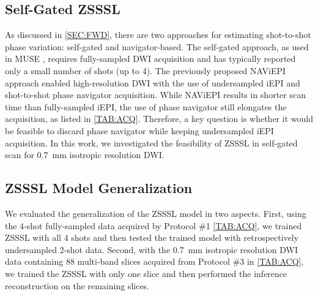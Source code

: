 \documentclass[journal,twoside,web]{ieeecolor}
\begin{document}
	\subsection{Self-Gated ZSSSL}

	As discussed in \cref{SEC:FWD}, there are two approaches for
	estimating shot-to-shot phase variation: self-gated and navigator-based.
	The self-gated approach, as used in MUSE \cite{chen_2013_muse},
	requires fully-sampled DWI acquisition and
	has typically reported only a small number of shots (up to 4).
	The previously proposed NAViEPI approach enabled high-resolution DWI
	with the use of undersampled iEPI and shot-to-shot phase navigator acquisition.
	While NAViEPI results in shorter scan time than fully-sampled iEPI,
	the use of phase navigator still elongates the acquisition,
	as listed in \cref{TAB:ACQ}.
	Therefore, a key question is whether it would be feasible to
	discard phase navigator while keeping undersampled iEPI acquisition.
	In this work, we investigated the feasibility of ZSSSL in self-gated scan
	for \SI{0.7}{\milli\meter} isotropic resolution DWI.

	\subsection{ZSSSL Model Generalization} \label{SEC:ZSSSL_GEN}

	We evaluated the generalization of the ZSSSL model in two aspects.
	First, using the 4-shot fully-sampled data acquired by
	Protocol \#1 \cref{TAB:ACQ}, we trained ZSSSL with all 4 shots
	and then tested the trained model with retrospectively undersampled 2-shot data.
	Second, with the \SI{0.7}{\milli\meter} isotropic resolution DWI data
	containing 88 multi-band slices acquired from Protocol \#3 in \cref{TAB:ACQ},
	we trained the ZSSSL with only one slice and
	then performed the inference reconstruction on the remaining slices.

\end{document}
